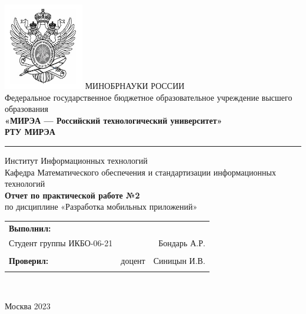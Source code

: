 \begin{center}
	\includegraphics[scale=0.5]{./res/logo} \break %
	\normalsize{МИНОБРНАУКИ РОССИИ}\\
	\normalsize{Федеральное государственное бюджетное образовательное учреждение высшего образования}\\
	\normalsize{\textbf{«МИРЭА --- Российский технологический университет»}}\\
	\large{\textbf{РТУ МИРЭА}}\\
	\bigskip \hrule \smallskip
	\normalsize{Институт Информационных технологий}\\
	\vfill
	\normalsize{Кафедра Математического обеспечения и стандартизации информационных технологий}\\
	\vfill
	\large{\textbf{Отчет по практической работе №2}}\\
	\normalsize{по дисциплине «Разработка мобильных приложений»}\\
	\vfill
	\vfill
	\normalsize{
		\begin{tabular}{lrr}
			\textbf{Выполнил:} & &\\
			Студент группы ИКБО-06-21 & & Бондарь А.Р. \\\\
			\textbf{Проверил:} &  доцент & Синицын И.В. \\\\
		\end{tabular}
	}\\
	\vfill
\end{center}

\begin{center} Москва 2023 \end{center}

\thispagestyle{empty}

